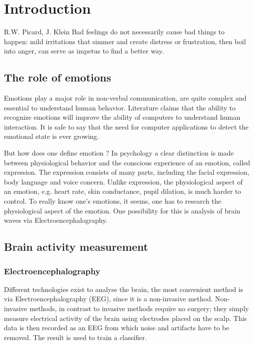 \chapter{Introduction}

\begin{chapquote}{R.W. Picard, J. Klein\cite{CompRecognizeEmotion}}
Bad feelings do not necessarily cause bad things to happen: mild irritations that simmer and create distress or frustration, then boil into anger, can serve as impetus to find a better way.
\end{chapquote}

\section{The role of emotions}
Emotions play a major role in non-verbal communication, are quite complex and essential to understand human behavior. Literature claims that the ability to recognize emotions will improve the ability of computers to understand human interaction\cite{CompRecognizeEmotion}. It is safe to say that the need for computer applications to detect the emotional state is ever growing. 

\npar

But how does one define emotion ? In psychology a clear distinction is made between physiological behavior and the conscious experience of an emotion, called expression\cite{ExtendedPaper}. The expression consists of many parts, including the facial expression, body language and voice concern. Unlike expression, the physiological aspect of an emotion, e.g. heart rate, skin conductance, pupil dilation, is much harder to control. To really know one's emotions, it seems, one has to research the physiological aspect of the emotion. One possibility for this is analysis of brain waves via Electroencephalography\cite{EEGDatasets}.

\section{Brain activity measurement}

\subsection{Electroencephalography}
Different technologies exist to analyse the brain, the most convenient method is via Electroencephalography (EEG), since it is a non-invasive method. Non-invasive methods, in contrast to invasive methods require no surgery; they simply measure electrical activity of the brain using electrodes placed on the scalp. This data is then recorded as an EEG from which noise and artifacts have to be removed. The result is used to train a classifier. 

